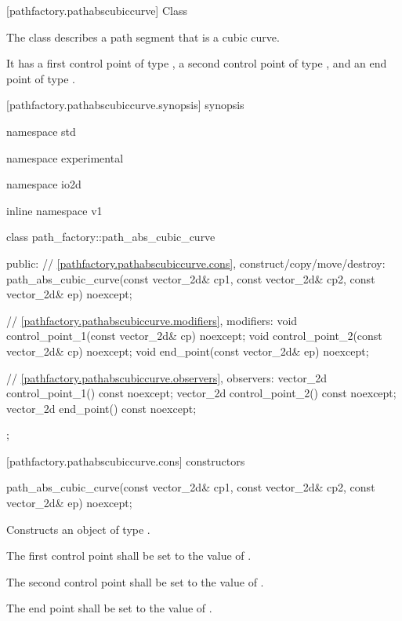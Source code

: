  [pathfactory.pathabscubiccurve] {Class }

\pnum
{}
The class  describes a path segment that is a cubic \bezierlocal curve.

\pnum
It has a first control point of type , a second control point of type , and an end point of type .

 [pathfactory.pathabscubiccurve.synopsis] { synopsis}

\begin{codeblock}
namespace std { namespace experimental { namespace io2d { inline namespace v1 {
  class path_factory::path_abs_cubic_curve {
  public:
    // \ref{pathfactory.pathabscubiccurve.cons}, construct/copy/move/destroy:
    path_abs_cubic_curve(const vector_2d& cp1, const vector_2d& cp2,
      const vector_2d& ep) noexcept;

    // \ref{pathfactory.pathabscubiccurve.modifiers}, modifiers:
    void control_point_1(const vector_2d& cp) noexcept;
    void control_point_2(const vector_2d& cp) noexcept;
    void end_point(const vector_2d& ep) noexcept;


    // \ref{pathfactory.pathabscubiccurve.observers}, observers:
    vector_2d control_point_1() const noexcept;
    vector_2d control_point_2() const noexcept;
    vector_2d end_point() const noexcept;
  };
} } } }
\end{codeblock}

 [pathfactory.pathabscubiccurve.cons] { constructors}

\begin{itemdecl}
    path_abs_cubic_curve(const vector_2d& cp1, const vector_2d& cp2,
      const vector_2d& ep) noexcept;
\end{itemdecl}
\begin{itemdescr}
	\pnum
	\effects
	Constructs an object of type .
	
	\pnum
	The first control point shall be set to the value of .
	
	\pnum
	The second control point shall be set to the value of .
	
	\pnum
	The end point shall be set to the value of .
\end{itemdescr}

